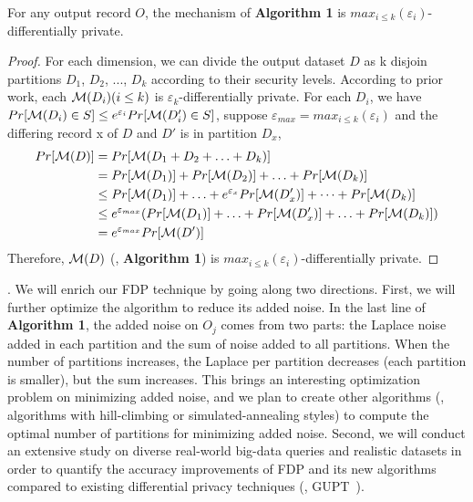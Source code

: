 \begin{theorem}
  For any output record $O$, the
  mechanism of \textbf{Algorithm 1} is $max_{i \le 
k}(\varepsilon_i)$-differentially private.
\end{theorem}
\begin{proof}
  For each dimension, we can divide the output dataset $D$ as k disjoin partitions 
$D_1$, $D_2$,
  ..., $D_k$ according to their security levels. According to 
prior work\cite{pointestimation:smith08},
  each ${\cal M}(D_i)(i \le k)$ is $\varepsilon_k$-differentially private.
  For each $D_i$, we have $Pr[{\cal M}(D_i) \in S] \le e^{\varepsilon_i}Pr[{\cal M}(D'_i) \in 
S]$, suppose $\varepsilon_{max} = max_{i \le k}(\varepsilon_i)$ and the 
differing record x of $D$ and $D'$ is in partition $D_x$, \\
  \vspace{-0.1in}
  \begin{equation} \label{eq1}
  \begin{split}
  Pr[{\cal M}(D)] & = Pr[{\cal M}(D_1 + D_2 + \ldots + D_k)] \\
   & = Pr[{\cal M}(D_1)] + Pr[{\cal M}(D_2)] + \ldots + Pr[{\cal M}(D_k)] \\
   & \le Pr[{\cal M}(D_1)] + \ldots + e^{\varepsilon_x}Pr[{\cal M}(D'_x)] + 
\dots + Pr[{\cal M}(D_k)] \\
   & \le  e^{\varepsilon_{max}}(Pr[{\cal M}(D_1)] + \ldots + Pr[{\cal 
M}(D'_x)] + \ldots + Pr[{\cal M}(D_k)]) \\
   & = e^{\varepsilon_{max}}Pr[{\cal M}(D')]
  \end{split}
  \end{equation}
  Therefore, ${\cal M}(D)$ (\ie, \textbf{Algorithm 1}) is $max_{i \le 
k}(\varepsilon_i)$-differentially private.
\end{proof}

. We will enrich our FDP technique by going 
along two directions. First, we will further optimize the algorithm to 
reduce its added noise. In the last line of \textbf{Algorithm 1}, the added 
noise on $O_j$ comes from two parts: the Laplace noise added in each partition 
and the sum of noise added to all partitions. When the number of partitions 
increases, the Laplace per partition decreases (each partition is smaller), but 
the sum increases. This brings an interesting optimization problem on 
minimizing added noise, and we plan to create other algorithms (\eg, 
algorithms with hill-climbing or simulated-annealing styles) to compute the 
optimal number of partitions for minimizing added noise. Second, 
we will conduct an extensive study on diverse real-world big-data queries and 
realistic datasets in order to quantify the accuracy improvements of FDP and 
its new algorithms compared to existing differential privacy techniques (\eg, 
GUPT~\cite{gupt:sigmod12}).

